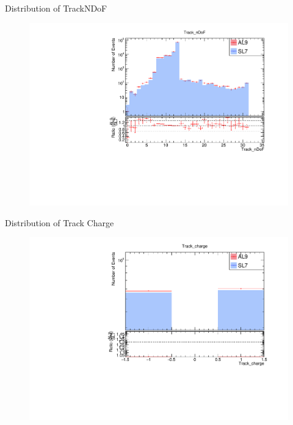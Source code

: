 \begin{frame}{Distribution of TrackNDoF}
    \begin{figure}
        \includegraphics[width=\linewidth]{./output/Track_nDoF.pdf}
    \end{figure}
\end{frame}

\begin{frame}{Distribution of Track Charge}
    \begin{figure}
        \includegraphics[width=\linewidth]{./output/Track_charge.pdf}
    \end{figure}
\end{frame}


